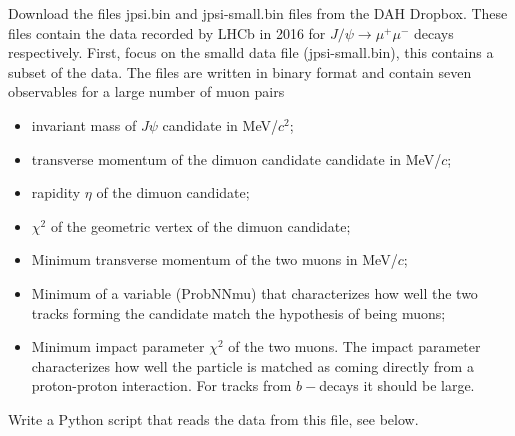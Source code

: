 Download the files jpsi.bin and jpsi-small.bin files  from the DAH Dropbox. These files contain the data recorded by LHCb in 2016 for $J/\psi \rightarrow \mu^+ \mu^-$ decays respectively. First, focus on the smalld data file (jpsi-small.bin), this contains a subset of the data. The files are written in binary format and contain seven observables for a large number of muon pairs
\begin{itemize}
\item  invariant mass of $J\psi$  candidate  in  MeV/$c^2$;
\item transverse momentum of  the dimuon candidate  candidate in MeV/$c$;
\item rapidity $\eta$ of the dimuon candidate;
\item $\chi^2$ of the geometric vertex of the dimuon candidate; 
\item Minimum transverse momentum of the two muons in MeV/$c$;
\item Minimum of a variable (ProbNNmu) that characterizes how well the two tracks forming the candidate match the hypothesis of being muons;
\item Minimum impact parameter $\chi^2$ of the two muons. The impact parameter characterizes how well the particle is matched as coming directly from a proton-proton interaction. For tracks from
 $b-$decays it should be large.
\end{itemize}

Write a Python script that reads the data from this file, see below. 


